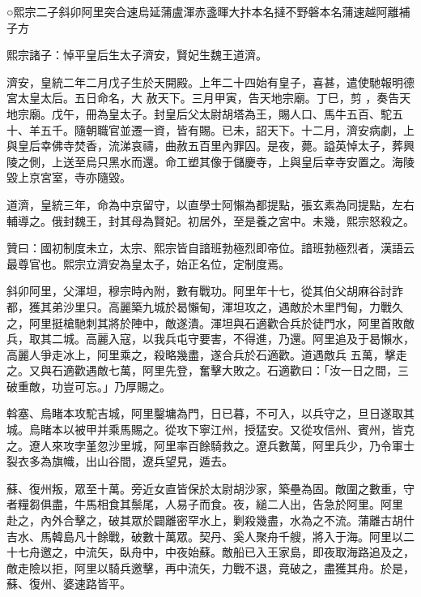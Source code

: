 
\begin{pinyinscope}

 ○熙宗二子斜卯阿里突合速烏延蒲盧渾赤盞暉大抃本名撻不野磐本名蒲速越阿離補子方



 熙宗諸子：悼平皇后生太子濟安，賢妃生魏王道濟。


濟安，皇統二年二月戊子生於天開殿。上年二十四始有皇子，喜甚，遣使馳報明德宮太皇太后。五日命名，大
 赦天下。三月甲寅，告天地宗廟。丁巳，剪
 ，奏告天地宗廟。戊午，冊為皇太子。封皇后父太尉胡塔為王，賜人口、馬牛五百、駝五十、羊五千。隨朝職官並遷一資，皆有賜。已未，詔天下。十二月，濟安病劇，上與皇后幸佛寺焚香，流涕哀禱，曲赦五百里內罪囚。是夜，薨。謚英悼太子，葬興陵之側，上送至烏只黑水而還。命工塑其像于儲慶寺，上與皇后幸寺安置之。海陵毀上京宮室，寺亦隨毀。



 道濟，皇統三年，命為中京留守，以直學士阿懶為都提點，張玄素為同提點，左右輔導之。俄封魏王，封其母為賢妃。初居外，至是養之宮中。未幾，熙宗怒殺之。



 贊曰：國初制度未立，太宗、熙宗皆自諳班勃極烈即帝位。諳班勃極烈者，漢語云最尊官也。熙宗立濟安為皇太子，始正名位，定制度焉。



 斜卯阿里，父渾坦，穆宗時內附，數有戰功。阿里年十七，從其伯父胡麻谷討詐都，獲其弟沙里只。高麗築九城於曷懶甸，渾坦攻之，遇敵於木里門甸，力戰久之，阿里挺槍馳刺其將於陣中，敵遂潰。渾坦與石適歡合兵於徒門水，阿里首敗敵兵，取其二城。高麗入寇，以我兵屯守要害，不得進，乃還。阿里追及于曷懶水，高麗人爭走冰上，阿里乘之，殺略幾盡，遂合兵於石適歡。道遇敵兵
 五萬，擊走之。又與石適歡遇敵七萬，阿里先登，奮擊大敗之。石適歡曰：「汝一日之間，三破重敵，功豈可忘。」乃厚賜之。



 斡塞、烏睹本攻駝吉城，阿里鑿墉為門，日已暮，不可入，以兵守之，旦日遂取其城。烏睹本以被甲并乘馬賜之。從攻下寧江州，授猛安。又從攻信州、賓州，皆克之。遼人來攻孛堇忽沙里城，阿里率百餘騎救之。遼兵數萬，阿里兵少，乃令軍士裂衣多為旗幟，出山谷間，遼兵望見，遁去。



 蘇、復州叛，眾至十萬。旁近女直皆保於太尉胡沙家，築壘為固。敵圍之數重，守者糧芻俱盡，牛馬相食其鬃尾，人易子而食。夜，縋二人出，告急於阿里。阿里
 赴之，內外合擊之，破其眾於闢離密罕水上，剿殺幾盡，水為之不流。蒲離古胡什吉水、馬韓島凡十餘戰，破數十萬眾。契丹、奚人聚舟千艘，將入于海。阿里以二十七舟邀之，中流矢，臥舟中，中夜始蘇。敵船已入王家島，即夜取海路追及之，敵走險以拒，阿里以騎兵邀擊，再中流矢，力戰不退，竟破之，盡獲其舟。於是，蘇、復州、婆速路皆平。




\end{pinyinscope}

